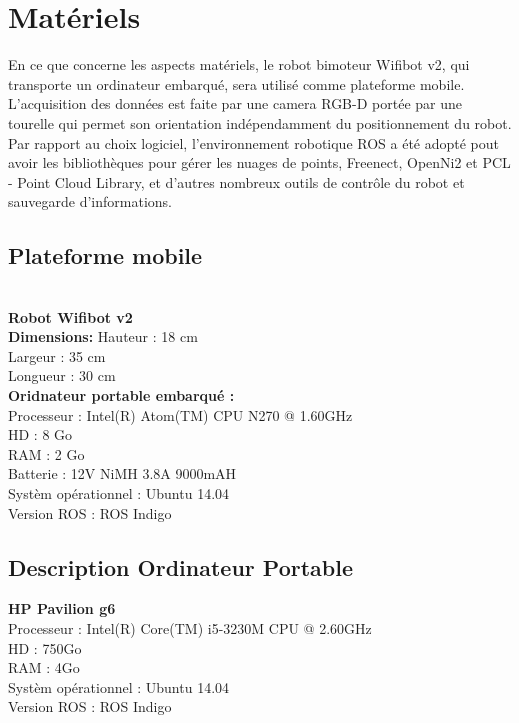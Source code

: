 \section{Matériels}

En ce que concerne les aspects matériels, le robot bimoteur Wifibot v2, qui transporte un ordinateur embarqué, sera utilisé comme plateforme mobile. L'acquisition des données est faite par une camera RGB-D portée par une tourelle qui permet son orientation indépendamment du positionnement du robot.
Par rapport au choix logiciel, l'environnement robotique ROS a été adopté pout avoir les bibliothèques pour gérer les nuages de points, Freenect, OpenNi2 et PCL - Point Cloud Library, et d'autres nombreux outils de contrôle du robot et sauvegarde d'informations.

\subsection{ Plateforme mobile } \\

\large{\textbf{Robot Wifibot v2}} \\
\textbf{Dimensions:}
Hauteur : 18 cm \\
Largeur : 35 cm \\
Longueur : 30 cm \\

\textbf{Oridnateur portable embarqué : } \\
Processeur : Intel(R) Atom(TM) CPU N270   @ 1.60GHz \\
HD : 8 Go \\
RAM : 2 Go \\
Batterie : 12V NiMH 3.8A 9000mAH \\

Systèm opérationnel : Ubuntu 14.04 \\
Version ROS : ROS Indigo \\ 

\subsection{Description Ordinateur Portable}

\textbf{HP Pavilion g6} \\
Processeur :  Intel(R) Core(TM) i5-3230M CPU @ 2.60GHz \\
HD : 750Go \\
RAM : 4Go \\

Systèm opérationnel : Ubuntu 14.04 \\
Version ROS : ROS Indigo \\

